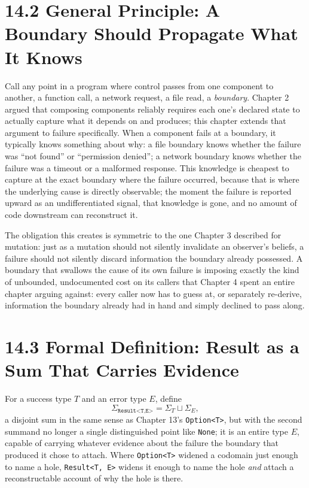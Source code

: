 \documentclass[11pt]{book}
\begin{document}
\section*{14.2 General Principle: A Boundary Should Propagate What It Knows}

Call any point in a program where control passes from one component to another, a function call, a network request, a file read, a \emph{boundary}. Chapter 2 argued that composing components reliably requires each one's declared state to actually capture what it depends on and produces; this chapter extends that argument to failure specifically. When a component fails at a boundary, it typically knows something about why: a file boundary knows whether the failure was ``not found'' or ``permission denied''; a network boundary knows whether the failure was a timeout or a malformed response. This knowledge is cheapest to capture at the exact boundary where the failure occurred, because that is where the underlying cause is directly observable; the moment the failure is reported upward as an undifferentiated signal, that knowledge is gone, and no amount of code downstream can reconstruct it.

The obligation this creates is symmetric to the one Chapter 3 described for mutation: just as a mutation should not silently invalidate an observer's beliefs, a failure should not silently discard information the boundary already possessed. A boundary that swallows the cause of its own failure is imposing exactly the kind of unbounded, undocumented cost on its callers that Chapter 4 spent an entire chapter arguing against: every caller now has to guess at, or separately re-derive, information the boundary already had in hand and simply declined to pass along.

\section*{14.3 Formal Definition: Result as a Sum That Carries Evidence}

For a success type $T$ and an error type $E$, define
\[
\Sigma_{\texttt{Result<T,E>}} = \Sigma_T \sqcup \Sigma_E,
\]
a disjoint sum in the same sense as Chapter 13's \texttt{Option<T>}, but with the second summand no longer a single distinguished point like \texttt{None}; it is an entire type $E$, capable of carrying whatever evidence about the failure the boundary that produced it chose to attach. Where \texttt{Option<T>} widened a codomain just enough to name a hole, \texttt{Result<T, E>} widens it enough to name the hole \emph{and} attach a reconstructable account of why the hole is there.
\end{document}
